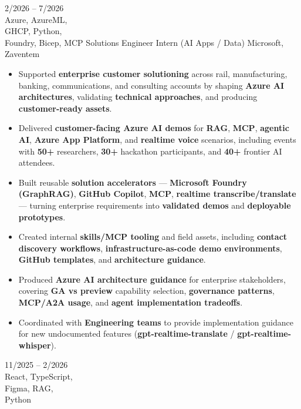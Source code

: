 \documentclass[8pt]{developercv} %
\begin{document}
\begin{entrylist}
    \entry
            {2/2026 -- 7/2026\\[3pt]Azure, AzureML, \\GHCP, Python, \\Foundry, Bicep, MCP}
		{Solutions Engineer Intern (AI Apps / Data)}
		{Microsoft, Zaventem}
		{%
      \begin{itemize}[leftmargin=*, itemsep=1pt, topsep=1pt, parsep=0pt, partopsep=0pt]
        \item Supported \textbf{enterprise customer solutioning} across rail, manufacturing, banking, communications, and consulting accounts by shaping \textbf{Azure AI architectures}, validating \textbf{technical approaches}, and producing \textbf{customer-ready assets}.
        \item Delivered \textbf{customer-facing Azure AI demos} for \textbf{RAG}, \textbf{MCP}, \textbf{agentic AI}, \textbf{Azure App Platform}, and \textbf{realtime voice} scenarios, including events with \textbf{50+} researchers, \textbf{30+} hackathon participants, and \textbf{40+} frontier AI attendees.
        \item Built reusable \textbf{solution accelerators} --- \textbf{Microsoft Foundry (GraphRAG)}, \textbf{GitHub Copilot}, \textbf{MCP}, \textbf{realtime transcribe/translate} --- turning enterprise requirements into \textbf{validated demos} and \textbf{deployable prototypes}.
        \item Created internal \textbf{skills/MCP tooling} and field assets, including \textbf{contact discovery workflows}, \textbf{infrastructure-as-code demo environments}, \textbf{GitHub templates}, and \textbf{architecture guidance}.
        \item Produced \textbf{Azure AI architecture guidance} for enterprise stakeholders, covering \textbf{GA vs preview} capability selection, \textbf{governance patterns}, \textbf{MCP/A2A usage}, and \textbf{agent implementation tradeoffs}.
        \item Coordinated with \textbf{Engineering teams} to provide implementation guidance for new undocumented features (\textbf{gpt-realtime-translate} / \textbf{gpt-realtime-whisper}).
      \end{itemize}
        }
    \entry
            {11/2025 -- 2/2026\\[3pt]React, TypeScript, \\Figma, RAG, \\Python}

\end{entrylist}
\end{document}
